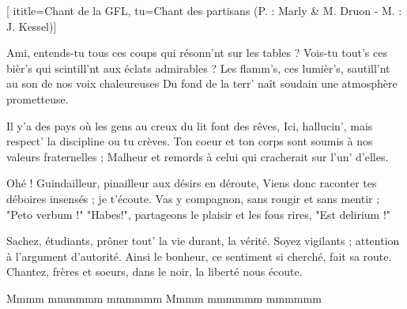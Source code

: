  [
	ititle={Chant de la GFL},
	tu={Chant des partisans (P. : Marly \& M. Druon - M. : J. Kessel)}]


\beginverse
Ami, entends-tu tous ces coups qui résonn'nt sur les tables ?
Vois-tu tout's ces bièr's qui scintill'nt aux éclats admirables ?
Les flamm's, ces lumièr's, sautill'nt au son de nos voix chaleureuses
Du fond de la terr' naît soudain une atmosphère prometteuse.
\endverse

\beginverse
Il y'a des pays où les gens au creux du lit font des rêves,
Ici, hallucin', mais respect' la discipline ou tu crèves.
Ton coeur et ton corps sont soumis à nos valeurs fraternelles ;
Malheur et remords à celui qui cracherait sur l'un' d'elles.
\endverse

\beginverse
Ohé ! Guindailleur, pinailleur aux désirs en déroute,
Viens donc raconter tes déboires insensés ; je t'écoute.
Vas y compagnon, sans rougir et sans mentir ; "Peto verbum !"
"Habes!", partageons le plaisir et les fous rires, "Est delirium !"
\endverse

\beginverse
Sachez, étudiants, prôner tout' la vie durant, la vérité.
Soyez vigilants ; attention à l'argument d'autorité.
Ainsi le bonheur, ce sentiment si cherché, fait sa route.
Chantez, frères et soeurs, dans le noir, la liberté nous écoute.
\endverse

\beginverse
Mmmm mmmmmm mmmmmm
Mmmm mmmmmm mmmmmm
\endverse

\endsong